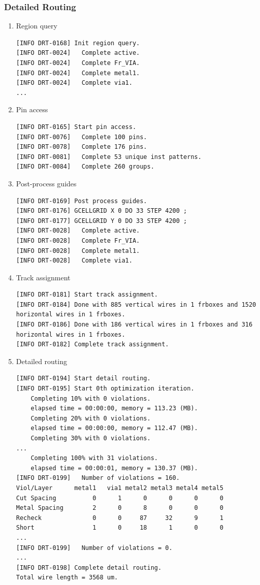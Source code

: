 \documentclass[a4paper,12pt,twoside]{article}
\begin{document}
\subsubsection{Detailed Routing}
\begin{enumerate}
    \item Region query
    \begin{verbatim}
[INFO DRT-0168] Init region query.
[INFO DRT-0024]   Complete active.
[INFO DRT-0024]   Complete Fr_VIA.
[INFO DRT-0024]   Complete metal1.
[INFO DRT-0024]   Complete via1.
...
    \end{verbatim}
    \item Pin access
    \begin{verbatim}
[INFO DRT-0165] Start pin access.
[INFO DRT-0076]   Complete 100 pins.
[INFO DRT-0078]   Complete 176 pins.
[INFO DRT-0081]   Complete 53 unique inst patterns.
[INFO DRT-0084]   Complete 260 groups.
    \end{verbatim}
    \item Post-process guides
    \begin{verbatim}
[INFO DRT-0169] Post process guides.
[INFO DRT-0176] GCELLGRID X 0 DO 33 STEP 4200 ;
[INFO DRT-0177] GCELLGRID Y 0 DO 33 STEP 4200 ;
[INFO DRT-0028]   Complete active.
[INFO DRT-0028]   Complete Fr_VIA.
[INFO DRT-0028]   Complete metal1.
[INFO DRT-0028]   Complete via1.
    \end{verbatim}
    \item Track assignment
    \begin{verbatim}
[INFO DRT-0181] Start track assignment.
[INFO DRT-0184] Done with 885 vertical wires in 1 frboxes and 1520 horizontal wires in 1 frboxes.
[INFO DRT-0186] Done with 186 vertical wires in 1 frboxes and 316 horizontal wires in 1 frboxes.
[INFO DRT-0182] Complete track assignment.
    \end{verbatim}
    \item Detailed routing
    \begin{verbatim}
[INFO DRT-0194] Start detail routing.
[INFO DRT-0195] Start 0th optimization iteration.
    Completing 10% with 0 violations.
    elapsed time = 00:00:00, memory = 113.23 (MB).
    Completing 20% with 0 violations.
    elapsed time = 00:00:00, memory = 112.47 (MB).
    Completing 30% with 0 violations.
...
    Completing 100% with 31 violations.
    elapsed time = 00:00:01, memory = 130.37 (MB).
[INFO DRT-0199]   Number of violations = 160.
Viol/Layer      metal1   via1 metal2 metal3 metal4 metal5
Cut Spacing          0      1      0      0      0      0
Metal Spacing        2      0      8      0      0      0
Recheck              0      0     87     32      9      1
Short                1      0     18      1      0      0
...
[INFO DRT-0199]   Number of violations = 0.
...
[INFO DRT-0198] Complete detail routing.
Total wire length = 3568 um.
    \end{verbatim}
\end{enumerate}
\end{document}
